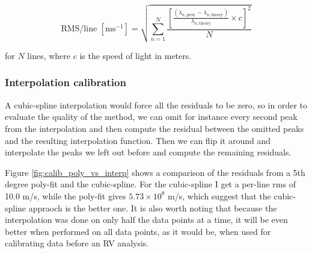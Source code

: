     \begin{equation}        
        \text{RMS/line } [\text{ms}^{-1}] = \sqrt{\sum_{n=1}^{N} \frac{\left[\frac{\left(\lambda_{n, \text {pred.}}-\lambda_{n, \text {theory}}\right)}{\lambda_{n,\text{theory}}} \times c\right]^{2}}{N}}
        \label{eq:line_rms}
    \end{equation}

    for $N$ lines, where $c$ is the speed of light in meters. 
    


    \subsubsection{Interpolation calibration}
    A cubic-spline interpolation would force all the residuals to be zero, so in order to evaluate the quality of the method, we can omit for instance every second peak from the interpolation and then compute the residual between the omitted peaks and the resulting interpolation function. Then we can flip it around and interpolate the peaks we left out before and compute the remaining residuals. 

    Figure \ref{fig:calib_poly_vs_interp} shows a comparison of the residuals from a 5th degree poly-fit and the cubic-spline. For the cubic-spline I get a per-line rms of 10.0 m/s, while the poly-fit gives $5.73 \times 10^8$ m/s, which suggest that the cubic-spline appraoch is the better one. It is also worth noting that because the interpolation was done on only half the data points at a time, it will be even better when performed on all data points, as it would be, when used for calibrating data before an RV analysis.

